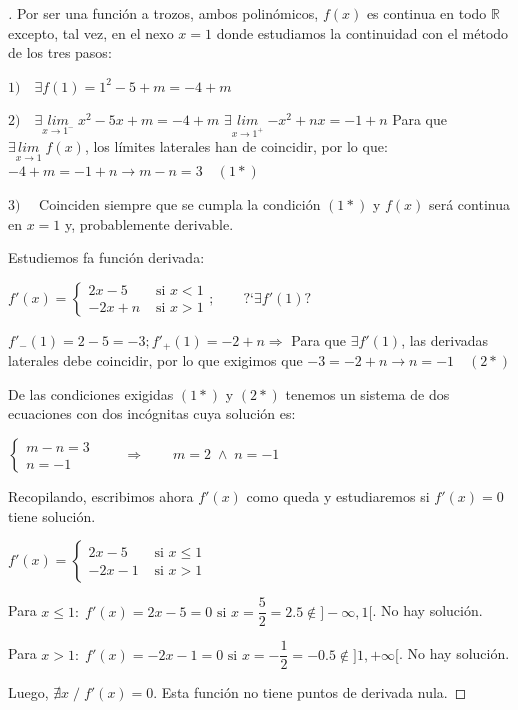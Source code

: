 	\begin{proof}[]
	\renewcommand{\qedsymbol}{$\diamond$}
	
	Por ser una función a trozos, ambos polinómicos, $f(x)$ es continua en todo $\mathbb R$ excepto, tal vez, en el nexo $x=1$ donde estudiamos la continuidad con el método de los tres pasos:
	
	$1) \quad \exists f(1)=1^2-5+m=-4+m$
	
	$2) \quad \exists \underset{x\to 1^-}{lim}\;{x^2-5x+m}=-4+m$
	$ \exists \underset{x\to 1^+}{lim}\;{-x^2+nx}=-1+n$
	Para que $\exists \underset{x\to 1}{lim}\;{f(x)}$, los límites laterales han de coincidir, por lo que: $-4+m=-1+n \to m-n=3 \quad (1*)$
	
	$3) \quad$ Coinciden siempre que se cumpla la condición $(1*)$ y $f(x)$ será continua en $x=1$ y, probablemente derivable.
	
	Estudiemos fa función derivada:
	
	$f'(x)=
		\begin{cases}
		2x-5 & \mbox{ si } x< 1 \\
		-2x+n & \mbox{ si } x >1  
		\end{cases} ; \qquad \mbox{?`} \exists f'(1)?$
		
	$f'_-(1)=2-5=-3; f'_+(1)=-2+n \Rightarrow $ Para que $\exists f'(1)$, las derivadas laterales debe coincidir, por lo que exigimos que $-3=-2+n \to n=-1 \quad (2*)$
	
	De las condiciones exigidas $(1*)$ y $(2*)$ tenemos un sistema de dos ecuaciones con dos incógnitas cuya solución es:
	
	$\begin{cases}
		m-n=3 \\
		n=-1
	\end{cases}  \qquad \Rightarrow \qquad m=2 \; \wedge \; n=-1$
	
	Recopilando, escribimos ahora $f'(x)$ como queda y estudiaremos si $f'(x)=0$ tiene solución.
	
	$f'(x)=
		\begin{cases}
		2x-5 & \mbox{ si } x\le 1 \\
		-2x-1 & \mbox{ si } x >1  
		\end{cases}$
	
	Para $x\le 1 :\; f'(x)=2x-5=0 \mbox{ si } x=\dfrac 5 2 = 2.5 \notin ]-\infty,1[ $. No hay solución.
	
	Para $x> 1 : \; f'(x)=-2x-1=0 \mbox{ si } x=-\dfrac 1 2 = -0.5 \notin ]1,+\infty[ $. No hay solución.
	
	Luego, $\nexists x \; / \; f'(x)=0$. Esta función no tiene puntos de derivada nula.
	\end{proof}
	
